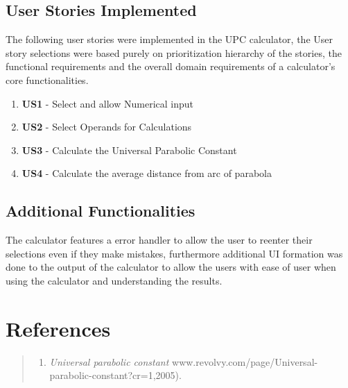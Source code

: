 \documentclass[12pt]{report}
\begin{document}
\section{User Stories Implemented}

The following user stories were implemented in the UPC calculator, the User story selections were based purely on prioritization hierarchy of the stories, the functional requirements and the overall domain requirements of a calculator's core functionalities.

\begin{enumerate}
    \item\textbf{ US1} - Select and allow Numerical input
    \item \textbf{US2} - Select Operands for Calculations
    \item \textbf{US3} - Calculate the Universal Parabolic Constant
    \item \textbf{US4} - Calculate the average distance from arc of parabola
\end{enumerate}



\section{Additional Functionalities}

The calculator features a error handler to allow the user to reenter their selections even if they make mistakes, furthermore additional UI formation was done to the output of the calculator to allow the users with ease of user when using the calculator and understanding the results. 


\chapter{References}
\begin{quote}
    

\begin{enumerate}
\item  {\it Universal parabolic constant\/} www.revolvy.com/page/Universal-parabolic-constant?cr=1,2005).

\end{enumerate}


        

\end{quote}
\end{document}
